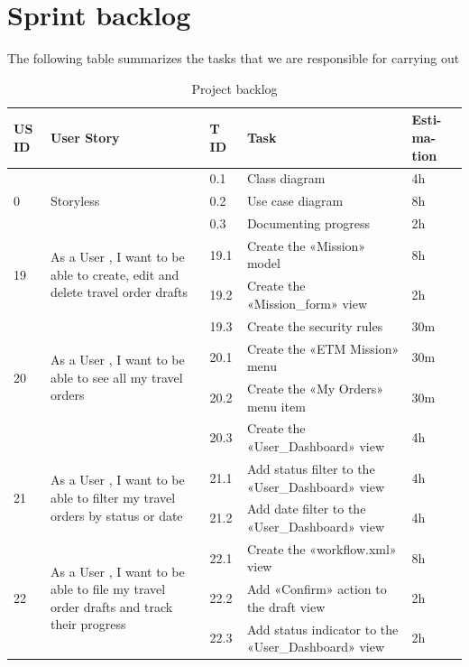 \section{Sprint backlog}
The following table summarizes the tasks that we are responsible for carrying out 
\begin{center}
\begin{longtable}{|p{1cm}|p{}|p{}|p{}|p{}|}
\caption{ Project backlog }
\hline
\textbf{US ID} 
&\textbf{User Story}
&\textbf{T ID}
&\textbf{Task}
&\textbf{Esti- ma- tion}
\\
\hline
\multirow{ 3}{*}{0}
&\multirow{3}{*}{Storyless}
&0.1
&Class diagram
&4h\\\cline{3-5}
&
&0.2
&Use case diagram
&8h\\\cline{3-5}
&
&0.3
&Documenting progress
&2h\\\cline{3-5}
\hline

\multirow{2}{*}{19}
&\multirow{2}{=}{As a User , I want to be able to create, edit and delete travel order drafts}
&19.1
&Create the «Mission» model
&8h\\\cline{3-5}
&
&19.2
&Create the «Mission\_form» view
&2h\\\cline{3-5}
&
&19.3
&Create the security rules
&30m\\\cline{3-5}

\hline


\multirow{ 2}{*}{20}
&\multirow{2}{=}{As a User , I want to be able to see all my travel orders}
&20.1
&Create the «ETM Mission» menu
&30m\\\cline{3-5}
&
&20.2
&Create the «My Orders» menu item
&30m\\\cline{3-5}
&
&20.3
&Create the «User\_Dashboard» view
&4h\\\cline{3-5}
\hline


\multirow{2}{*}{21}
&\multirow{2}{=}{As a User , I want to be able to filter my travel orders by status or date}
&21.1
&Add status filter to the «User\_Dashboard» view
&4h\\\cline{3-5}
&
&21.2
&Add date filter to the «User\_Dashboard» view
&4h\\\cline{3-5}

\hline

\multirow{3}{*}{22}
&\multirow{3}{=}{As a User , I want to be able to file my travel order drafts and track their progress}
&22.1
&Create the «workflow.xml» view
&8h\\\cline{3-5}
&
&22.2
&Add  «Confirm» action to the draft view
&2h\\\cline{3-5}
&
&22.3
&Add status indicator to the «User\_Dashboard» view
&2h\\\cline{3-5}


\end{longtable}
\end{center}
